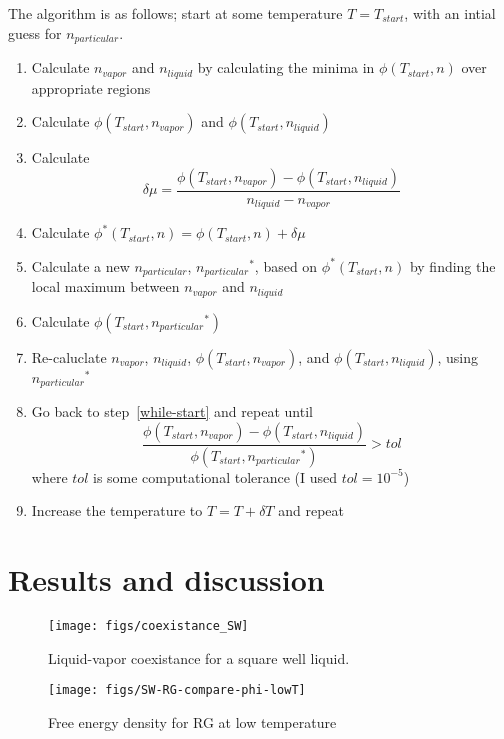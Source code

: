 \documentclass[letterpaper,twocolumn,amsmath,amssymb,prb]{revtex4-1}
\newcommand{\npart}{\ensuremath{n_{particular}}}
\newcommand{\nliq}{\ensuremath{n_{liquid}}}
\newcommand{\nvap}{\ensuremath{n_{vapor}}}
\newcommand{\1}{\ensuremath{\textbf{r}_1}}
\newcommand{\2}{\ensuremath{\textbf{r}_2}}
\begin{document}
The algorithm is as follows; start at some temperature $T=T_{start}$, with an intial guess for $\npart$.
\begin{enumerate}
  \item Calculate $\nvap$ and $\nliq$ by calculating the minima in $\phi(T_{start},n)$ over appropriate regions
  \item Calculate $\phi(T_{start},\nvap)$ and $\phi(T_{start},\nliq)$ \label{while-start}
  \item Calculate \[\delta\mu = \frac{\phi(T_{start},\nvap) - \phi(T_{start},\nliq)}{\nliq - \nvap}\]
  \item Calculate $\phi^*(T_{start},n) = \phi(T_{start},n) + \delta\mu$
  \item Calculate a new $\npart$, $\npart^*$, based on $\phi^*(T_{start},n)$ by finding the local maximum between $\nvap$ and $\nliq$
  \item Calculate $\phi(T_{start},\npart^*)$
  \item Re-caluclate $\nvap$, $\nliq$, $\phi(T_{start},\nvap)$, and $\phi(T_{start},\nliq)$, using $\npart^*$
  \item Go back to step~\ref{while-start} and repeat until \[ \frac{\phi(T_{start},\nvap) - \phi(T_{start},\nliq)}{\phi(T_{start},\npart^*)} > tol  \] where $tol$ is some computational tolerance (I used $tol=10^{-5}$)
  \item Increase the temperature to $T = T + \delta T$ and repeat
\end{enumerate}


\section{Results and discussion}

\begin{figure}
  \begin{center}
  \texttt{[image: figs/coexistance\_SW]}
  \end{center}
  \caption{Liquid-vapor coexistance for a square well liquid.}
  \label{fig:coexistance_SW}
\end{figure}

\begin{figure}
  \begin{center}
  \texttt{[image: figs/SW-RG-compare-phi-lowT]}
  \end{center}
  \caption{Free energy density for RG at low temperature}
  \label{fig:SW-RG-compare-lowT}
\end{figure}
\end{document}
